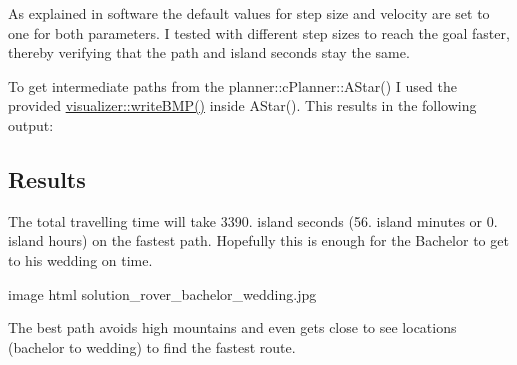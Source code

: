 As explained in software the default values for step size and velocity are set to one for both parameters. I tested with different step sizes to reach the goal faster, thereby verifying that the path and island seconds stay the same.

To get intermediate paths from the planner\+::c\+Planner\+::\+A\+Star() I used the provided \mbox{\hyperlink{namespacevisualizer_ab4e649cd7413a51ac1ae4b31a2994c3a}{visualizer\+::write\+B\+M\+P()}} inside A\+Star(). This results in the following output\+:

\subsection*{Results}

The total travelling time will take 3390. island seconds (56. island minutes or 0. island hours) on the fastest path. Hopefully this is enough for the Bachelor to get to his wedding on time.

image html solution\+\_\+rover\+\_\+bachelor\+\_\+wedding.\+jpg



The best path avoids high mountains and even gets close to see locations (bachelor to wedding) to find the fastest route.


